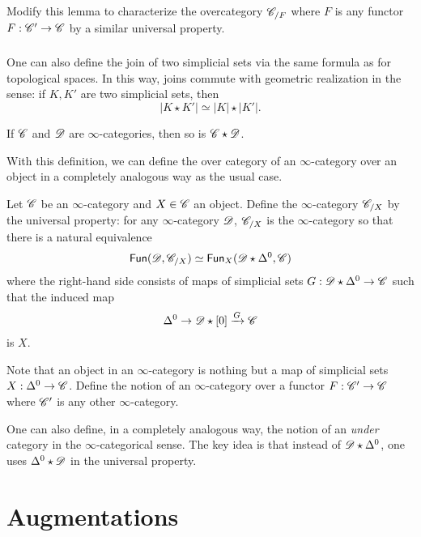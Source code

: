 \documentclass[11pt]{amsart}
\def\Fun{{\sf Fun}}
\begin{document}
\begin{ex} 
Modify this lemma to characterize the overcategory $\mathscr C_{/F}$ where $F$ is any functor $F : \mathscr C' \to \mathscr C$ by a similar universal property.  
\end{ex}

\subsubsection{}

One can also define the join of two simplicial sets via the same formula as for topological spaces. 
In this way, joins commute with geometric realization in the sense: if $K, K'$ are two simplicial sets, then
\[
|K \star K'| \simeq |K| \star |K'| .
\]

\begin{lem}
If $\mathscr C$ and $\mathscr D$ are $\infty$-categories, then so is $\mathscr C \star \mathscr D$. 
\end{lem}

With this definition, we can define the over category of an $\infty$-category over an object in a completely analogous way as the usual case. 

\begin{dfn}
Let $\mathscr C$ be an $\infty$-category and $X \in \mathscr C$ an object. 
Define the $\infty$-category $\mathscr C_{/X}$ by the universal property: for any $\infty$-category $\mathscr D$, $\mathscr C_{/X}$ is the $\infty$-category so that there is a natural equivalence
\[
\Fun(\sD, \sC_{/X}) \simeq \Fun_X(\sD \star \Delta^0, \sC)
\]
where the right-hand side consists of maps of simplicial sets $G : \mathscr D \star \Delta^0 \to \mathscr C$ such that the induced map
\[
\Delta^0 \to \mathscr D \star [0] \xrightarrow{G} \mathscr C
\]
is $X$. 
\end{dfn}

\begin{ex}
Note that an object in an $\infty$-category is nothing but a map of simplicial sets $X : \Delta^0 \to \mathscr C$. 
Define the notion of an $\infty$-category over a functor $F : \mathscr C' \to \mathscr C$ where $\mathscr C'$ is any other $\infty$-category. 
\end{ex}

One can also define, in a completely analogous way, the notion of an {\em under} category in the $\infty$-categorical sense. 
The key idea is that instead of $\mathscr D \star \Delta^0$, one uses $\Delta^0 \star \mathscr D$ in the universal property. 

\section{Augmentations}
\end{document}
